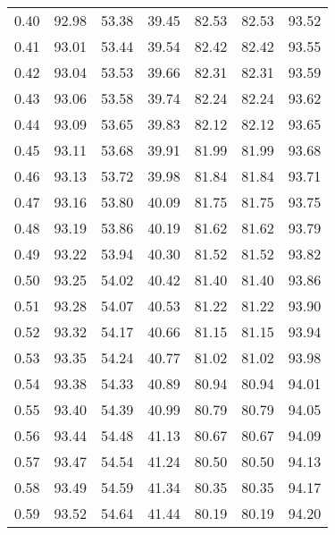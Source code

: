 \begin{tabular}{|c|c|c|c|c|c|c|}
      0.40 &     92.98 &     53.38 &      39.45 &   82.53 &      82.53 &         93.52 \\
      0.41 &     93.01 &     53.44 &      39.54 &   82.42 &      82.42 &         93.55 \\
      0.42 &     93.04 &     53.53 &      39.66 &   82.31 &      82.31 &         93.59 \\
      0.43 &     93.06 &     53.58 &      39.74 &   82.24 &      82.24 &         93.62 \\
      0.44 &     93.09 &     53.65 &      39.83 &   82.12 &      82.12 &         93.65 \\
      0.45 &     93.11 &     53.68 &      39.91 &   81.99 &      81.99 &         93.68 \\
      0.46 &     93.13 &     53.72 &      39.98 &   81.84 &      81.84 &         93.71 \\
      0.47 &     93.16 &     53.80 &      40.09 &   81.75 &      81.75 &         93.75 \\
      0.48 &     93.19 &     53.86 &      40.19 &   81.62 &      81.62 &         93.79 \\
      0.49 &     93.22 &     53.94 &      40.30 &   81.52 &      81.52 &         93.82 \\
      0.50 &     93.25 &     54.02 &      40.42 &   81.40 &      81.40 &         93.86 \\
      0.51 &     93.28 &     54.07 &      40.53 &   81.22 &      81.22 &         93.90 \\
      0.52 &     93.32 &     54.17 &      40.66 &   81.15 &      81.15 &         93.94 \\
      0.53 &     93.35 &     54.24 &      40.77 &   81.02 &      81.02 &         93.98 \\
      0.54 &     93.38 &     54.33 &      40.89 &   80.94 &      80.94 &         94.01 \\
      0.55 &     93.40 &     54.39 &      40.99 &   80.79 &      80.79 &         94.05 \\
      0.56 &     93.44 &     54.48 &      41.13 &   80.67 &      80.67 &         94.09 \\
      0.57 &     93.47 &     54.54 &      41.24 &   80.50 &      80.50 &         94.13 \\
      0.58 &     93.49 &     54.59 &      41.34 &   80.35 &      80.35 &         94.17 \\
      0.59 &     93.52 &     54.64 &      41.44 &   80.19 &      80.19 &         94.20 \\

\end{tabular}
